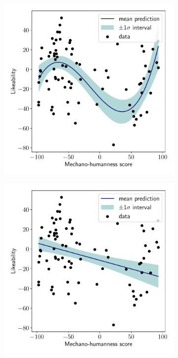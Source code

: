 \begin{figure}[ht]
    \centering
    \begin{subfigure}{.5\linewidth}
        \includegraphics[width=\textwidth]{pics/third_degree_curve_fit.pdf}
        \caption{}
        \label{subfig:third_degree_curve_fit}
    \end{subfigure}%
    \begin{subfigure}{.5\linewidth}
        \includegraphics[width=\textwidth]{pics/first_degree_curve_fit.pdf}
        \caption{}
        \label{subfig:first_degree_curve_fit}
    \end{subfigure}
    \caption{}
\end{figure}

